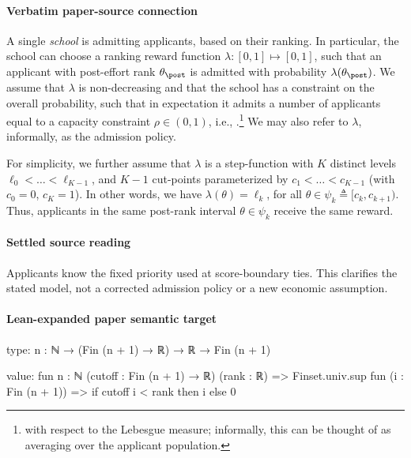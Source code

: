\documentclass[10pt]{article}
\begin{document}
\paragraph{Verbatim paper-source connection}
\begin{ReviewVerbatim}
 A single \textit{school} is admitting applicants, based on their ranking. In particular, the school can choose a ranking reward function $\lambda : [0, 1] \mapsto [0, 1]$, such that an applicant with post-effort rank $\theta_\post$ is admitted with probability $\lambda(\theta_\post)$. We assume that $\lambda$ is non-decreasing and that the school has a constraint on the overall probability, such that in expectation it admits a number of applicants equal to {a} capacity constraint  $\rho \in (0,1)$, i.e., \lledit{$\E_{\theta_\post}[\lambda(\theta_\post)] = \rho $}.\footnote{ with respect to the Lebesgue measure; informally, this can be thought of as averaging over the applicant population.} We may also refer to $\lambda$, informally, as the admission policy.



For simplicity, we further assume that $\lambda$ is a step-function with $K$ distinct levels $\ell_0 < \dots < \ell_{K-1}$, and $K-1$ cut-points parameterized by $c_1< \dots < c_{K-1}$ (with $c_0 = 0$, $c_K = 1$). %
In other words, we have $\lambda(\theta) = \ell_k$, for all $\theta \in \psi_k \triangleq [c_{k}, c_{k+1})$. Thus, applicants in the same post-rank interval $\theta \in \psi_k$ receive the same reward.
\end{ReviewVerbatim}

\paragraph{Settled source reading}
\begin{sloppypar}
Applicants know the fixed priority used at score-\allowbreak{}boundary ties.\allowbreak{} This clarifies the stated model, not a corrected admission policy or a new economic assumption.\allowbreak{}
\end{sloppypar}

\paragraph{Lean-expanded paper semantic target}
\begin{ReviewVerbatim}
type:
{n : ℕ} → (Fin (n + 1) → ℝ) → ℝ → Fin (n + 1)

value:
fun {n : ℕ} (cutoff : Fin (n + 1) → ℝ) (rank : ℝ) =>
  Finset.univ.sup fun (i : Fin (n + 1)) => if cutoff i < rank then i else 0
\end{ReviewVerbatim}
\end{document}
